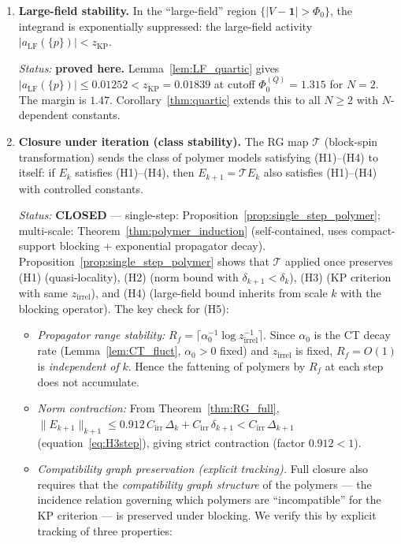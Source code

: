\documentclass[11pt,a4paper]{amsart}
\theoremstyle{definition}
\begin{document}
\begin{enumerate}[label=\textbf{(H\arabic*)},leftmargin=2.5cm,itemsep=6pt]
\item[\textbf{(H4)}] \textbf{Large-field stability.}
  In the ``large-field'' region $\{|V - \mathbf{1}| > \Phi_0\}$, the integrand
  is exponentially suppressed: the large-field activity $|a_{\mathrm{LF}}(\{p\})| < z_{\mathrm{KP}}$.

  \emph{Status:} \textbf{proved here.}
  Lemma~\ref{lem:LF_quartic} gives $|a_{\mathrm{LF}}(\{p\})| \le 0.01252 < z_{\mathrm{KP}} = 0.01839$
  at cutoff $\Phi_0^{(Q)} = 1.315$ for $N = 2$.  The margin is $1.47$.
  Corollary~\ref{thm:quartic} extends this to all $N \ge 2$ with $N$-dependent constants.

\item[\textbf{(H5)}] \textbf{Closure under iteration (class stability).}
  The RG map $\mathcal{T}$ (block-spin transformation) sends the class of polymer models
  satisfying (H1)--(H4) to itself: if $E_k$ satisfies (H1)--(H4), then $E_{k+1} = \mathcal{T}E_k$
  also satisfies (H1)--(H4) with controlled constants.

  \emph{Status:} \textbf{CLOSED} --- single-step: Proposition~\ref{prop:single_step_polymer};
  multi-scale: Theorem~\ref{thm:polymer_induction} (self-contained, uses compact-support
  blocking + exponential propagator decay).
  Proposition~\ref{prop:single_step_polymer} shows that $\mathcal{T}$ applied once
  preserves (H1) (quasi-locality), (H2) (norm bound with $\delta_{k+1} < \delta_k$),
  (H3) (KP criterion with same $z_{\mathrm{irrel}}$), and (H4) (large-field bound
  inherits from scale $k$ with the blocking operator).  The key check for (H5):

  \begin{itemize}
  \item \emph{Propagator range stability:} $R_f = \lceil\alpha_0^{-1}\log z_{\mathrm{irrel}}^{-1}\rceil$.
        Since $\alpha_0$ is the CT decay rate (Lemma~\ref{lem:CT_fluct}, $\alpha_0 > 0$ fixed)
        and $z_{\mathrm{irrel}}$ is fixed, $R_f = O(1)$ is \emph{independent of} $k$.
        Hence the fattening of polymers by $R_f$ at each step does not accumulate.
  \item \emph{Norm contraction:} From Theorem~\ref{thm:RG_full},
        $\|E_{k+1}\|_{k+1} \le 0.912\,C_{\mathrm{irr}}\,\Delta_k + C_{\mathrm{irr}}\,\delta_{k+1}
        < C_{\mathrm{irr}}\,\Delta_{k+1}$ (equation~\eqref{eq:H3step}),
        giving strict contraction (factor $0.912 < 1$).
  \item \emph{Compatibility graph preservation (explicit tracking).}
        Full closure also requires that the \emph{compatibility graph structure}
        of the polymers --- the incidence relation governing which polymers are
        ``incompatible'' for the KP criterion --- is preserved under blocking.
        We verify this by explicit tracking of three properties:


\end{itemize}
\end{enumerate}
\end{document}
